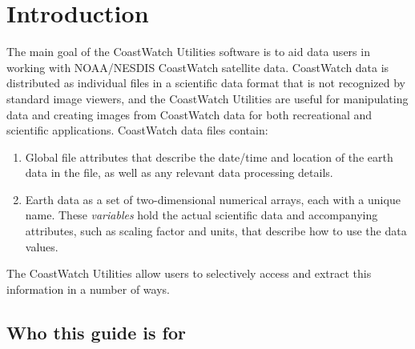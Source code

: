 \chapter{Introduction}

The main goal of the CoastWatch Utilities software is to aid data
users in working with NOAA/NESDIS CoastWatch satellite data. 
CoastWatch data is distributed as individual files in a scientific
data format that is not recognized by standard image viewers, and the
CoastWatch Utilities are useful for manipulating data and creating images
from CoastWatch data for both recreational and scientific
applications.  CoastWatch data files contain:
\begin{enumerate}

  \item Global file attributes that describe the date/time and
  location of the earth data in the file, as well as any relevant data
  processing details.

  \item Earth data as a set of two-dimensional numerical arrays, each
  with a unique name.  These {\em variables} hold the actual
  scientific data and accompanying attributes, such as scaling factor
  and units, that describe how to use the data values.

\end{enumerate}
The CoastWatch Utilities allow users to selectively access and extract
this information in a number of ways.

\section*{Who this guide is for}

